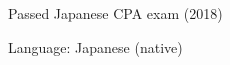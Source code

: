 

\begin{cventries}

\cventrysimple
    {Passed Japanese CPA exam (2018)}  %
    {} %
    {}

\cventrysimple
    {Language: Japanese (native)}  %
    {} %
    {}


\end{cventries}
